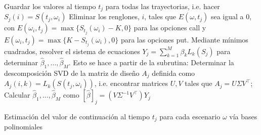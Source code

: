 \documentclass[11pt]{article}
\begin{document}
\begin{algorithm}[H]
\DontPrintSemicolon
\SetAlgoLined
{}
\BlankLine
Guardar los valores al tiempo $t_j$ para todas las trayectorias, i.e. hacer $S_j(i)=S(t_j,\omega_i)$\;
Eliminar los renglones, $i$, tales que $E(\omega,t_j)$ sea igual a 0, con $E(\omega_i,t_j)=\max\{S_{t_j}(\omega_i)-K,0\}$ para las opciones call y $E(\omega_i,t_j)=\max\{K-S_{t_j}(\omega_i),0\}$ para las opciones put.\;
Mediante mínimos cuadrados, resolver el sistema de ecuaciones $Y_j = \sum_{k=1}^M \beta_kL_k(S_j)$ para determinar $\hat{\beta}_1,\ldots,\hat{\beta}_M$. Esto se hace a partir de la subrutina:\;
Determinar la descomposición SVD de la matriz de diseño $A_j$ definida como $A_j(i,k)=L_k(S(t_j,\omega_i))$, i.e. encontrar matrices $U,V$ tales que $A_j = U\Sigma V^{\top}$;
Calcular $\hat{\beta}_1,\ldots,\hat{\beta}_M$ como $[\hat{\beta}]_j = (V\Sigma^{-1}V^{\top})Y_j$\;
\caption{Estimación del valor de continuación al tiempo $t_j$ para cada escenario $\omega$ vía bases polinomiales}
\end{algorithm}
\end{document}
